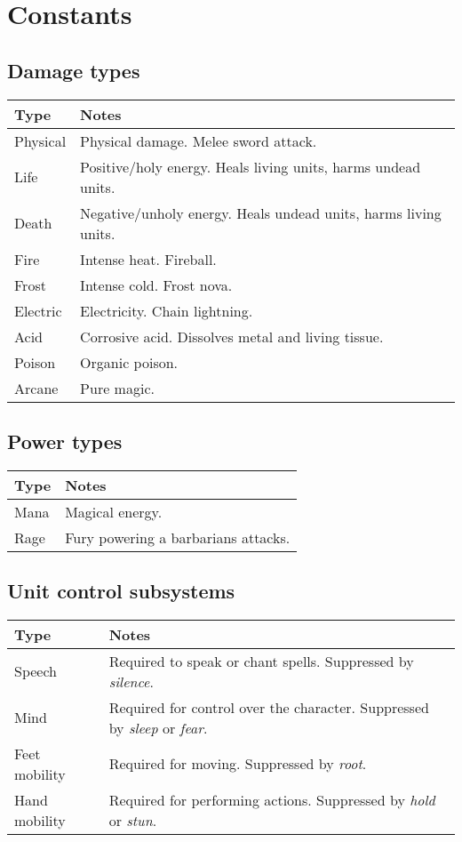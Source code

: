 \chapter{Constants}

\section{Damage types}

\begin{tabular}{l l}
\toprule
Type & Notes \\
\midrule
Physical & Physical damage. Melee sword attack. \\
Life & Positive/holy energy. Heals living units, harms undead units.\\
Death & Negative/unholy energy. Heals undead units, harms living units. \\
Fire & Intense heat. Fireball. \\
Frost & Intense cold. Frost nova. \\
Electric & Electricity. Chain lightning. \\
Acid & Corrosive acid. Dissolves metal and living tissue.\\
Poison & Organic poison. \\
Arcane & Pure magic. \\
\bottomrule
\end{tabular}

\section{Power types}

\begin{tabular}{l l}
\toprule
Type & Notes \\
\midrule
Mana & Magical energy. \\
Rage & Fury powering a barbarians attacks.\\
\bottomrule
\end{tabular}

\section{Unit control subsystems}

\begin{tabular}{l l}
\toprule
Type & Notes \\
\midrule
Speech & Required to speak or chant spells. Suppressed by \emph{silence}.\\
Mind & Required for control over the character. Suppressed by \emph{sleep} or \emph{fear}.\\
Feet mobility & Required for moving. Suppressed by \emph{root}. \\
Hand mobility & Required for performing actions. Suppressed by \emph{hold} or \emph{stun}.\\
\bottomrule
\end{tabular}


